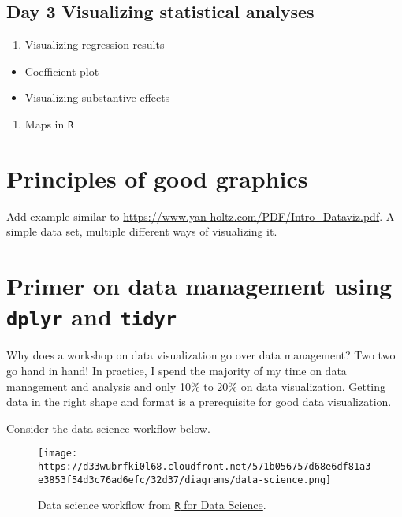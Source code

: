 \documentclass[]{article}
\providecommand{\tightlist}{%
  \setlength{\itemsep}{0pt}\setlength{\parskip}{0pt}}
\begin{document}
\hypertarget{day-3-visualizing-statistical-analyses}{%
\subsection{Day 3 Visualizing statistical
analyses}\label{day-3-visualizing-statistical-analyses}}

\begin{enumerate}
\def\labelenumi{\arabic{enumi}.}
\tightlist
\item
  Visualizing regression results
\end{enumerate}

\begin{itemize}
\tightlist
\item
  Coefficient plot
\item
  Visualizing substantive effects
\end{itemize}

\begin{enumerate}
\def\labelenumi{\arabic{enumi}.}
\setcounter{enumi}{1}
\tightlist
\item
  Maps in \texttt{R}
\end{enumerate}

\hypertarget{principles-of-good-graphics}{%
\section{Principles of good
graphics}\label{principles-of-good-graphics}}

Add example similar to
\url{https://www.yan-holtz.com/PDF/Intro_Dataviz.pdf}. A simple data
set, multiple different ways of visualizing it.

\hypertarget{primer-on-data-management-using-dplyr-and-tidyr}{%
\section{\texorpdfstring{Primer on data management using \texttt{dplyr}
and
\texttt{tidyr}}{Primer on data management using dplyr and tidyr}}\label{primer-on-data-management-using-dplyr-and-tidyr}}

Why does a workshop on data visualization go over data management? Two
two go hand in hand! In practice, I spend the majority of my time on
data management and analysis and only 10\% to 20\% on data
visualization. Getting data in the right shape and format is a
prerequisite for good data visualization.

Consider the data science workflow below.

\begin{figure}
\centering
\texttt{[image: https://d33wubrfki0l68.cloudfront.net/571b056757d68e6df81a3e3853f54d3c76ad6efc/32d37/diagrams/data-science.png]}
\caption{Data science workflow from
\href{https://r4ds.had.co.nz}{\texttt{R} for Data Science}.}
\end{figure}
\end{document}
